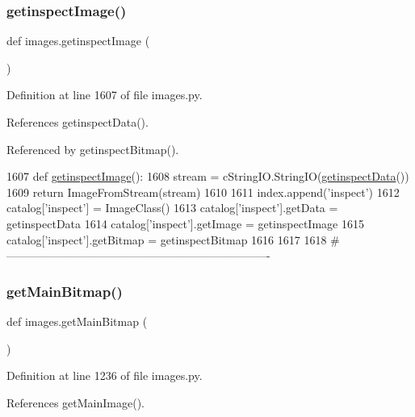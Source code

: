 \subsubsection{\texorpdfstring{getinspect\+Image()}{getinspectImage()}}
{\footnotesize\ttfamily def images.\+getinspect\+Image (\begin{DoxyParamCaption}{ }\end{DoxyParamCaption})}



Definition at line 1607 of file images.\+py.



References getinspect\+Data().



Referenced by getinspect\+Bitmap().


\begin{DoxyCode}
1607 \textcolor{keyword}{def }\hyperlink{namespaceimages_a94ab13bbfd0d57bd0543469f7f8a003f}{getinspectImage}():
1608     stream = cStringIO.StringIO(\hyperlink{namespaceimages_aa0295fd7df9df8a8c36dbf45957ebe34}{getinspectData}())
1609     \textcolor{keywordflow}{return} ImageFromStream(stream)
1610 
1611 index.append(\textcolor{stringliteral}{'inspect'})
1612 catalog[\textcolor{stringliteral}{'inspect'}] = ImageClass()
1613 catalog[\textcolor{stringliteral}{'inspect'}].getData = getinspectData
1614 catalog[\textcolor{stringliteral}{'inspect'}].getImage = getinspectImage
1615 catalog[\textcolor{stringliteral}{'inspect'}].getBitmap = getinspectBitmap
1616 
1617 
1618 \textcolor{comment}{#----------------------------------------------------------------------}
\end{DoxyCode}
\mbox{\label{namespaceimages_a13b0b106848f0bb45083014d906d9c93}} 
\subsubsection{\texorpdfstring{get\+Main\+Bitmap()}{getMainBitmap()}}
{\footnotesize\ttfamily def images.\+get\+Main\+Bitmap (\begin{DoxyParamCaption}{ }\end{DoxyParamCaption})}



Definition at line 1236 of file images.\+py.



References get\+Main\+Image().


